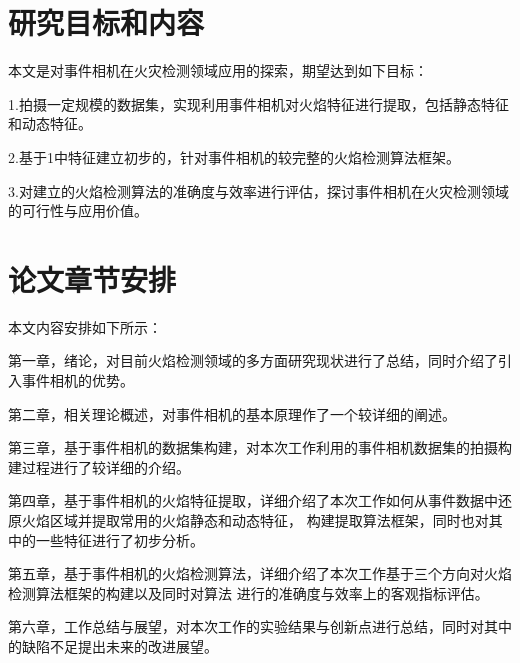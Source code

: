 \section{研究目标和内容}

本文是对事件相机在火灾检测领域应用的探索，期望达到如下目标：

1.拍摄一定规模的数据集，实现利用事件相机对火焰特征进行提取，包括静态特征和动态特征。

2.基于1中特征建立初步的，针对事件相机的较完整的火焰检测算法框架。

3.对建立的火焰检测算法的准确度与效率进行评估，探讨事件相机在火灾检测领域的可行性与应用价值。

\section{论文章节安排}

本文内容安排如下所示：

第一章，绪论，对目前火焰检测领域的多方面研究现状进行了总结，同时介绍了引入事件相机的优势。

第二章，相关理论概述，对事件相机的基本原理作了一个较详细的阐述。

第三章，基于事件相机的数据集构建，对本次工作利用的事件相机数据集的拍摄构建过程进行了较详细的介绍。

第四章，基于事件相机的火焰特征提取，详细介绍了本次工作如何从事件数据中还原火焰区域并提取常用的火焰静态和动态特征，
构建提取算法框架，同时也对其中的一些特征进行了初步分析。

第五章，基于事件相机的火焰检测算法，详细介绍了本次工作基于三个方向对火焰检测算法框架的构建以及同时对算法
进行的准确度与效率上的客观指标评估。

第六章，工作总结与展望，对本次工作的实验结果与创新点进行总结，同时对其中的缺陷不足提出未来的改进展望。
